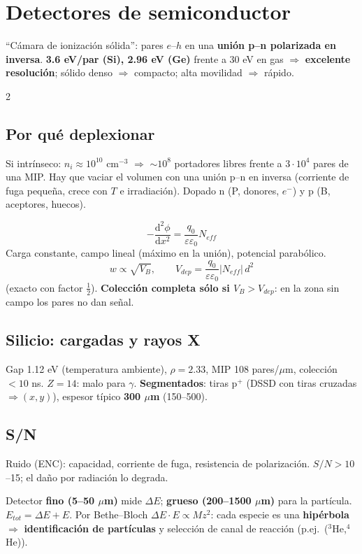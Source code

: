 \documentclass[10pt,a4paper]{article}
\newcommand{\imp}[1]{\textbf{\color{BrickRed}#1}}
\begin{document}
\section{Detectores de semiconductor}
\begin{clave}
``Cámara de ionización sólida'': pares $e$--$h$ en una \textbf{unión p--n polarizada en inversa}. \textbf{3.6 eV/par (Si), 2.96 eV (Ge)} frente a 30 eV en gas
$\Rightarrow$ \imp{excelente resolución}; sólido denso $\Rightarrow$ compacto; alta movilidad $\Rightarrow$ rápido.
\end{clave}
\begin{multicols}{2}
\subsection{Por qué deplexionar}
Si intrínseco: $n_i\approx10^{10}$ cm$^{-3}$ $\Rightarrow$ $\sim10^8$ portadores libres frente a $3\cdot10^4$ pares de una MIP. Hay que vaciar el volumen con una unión p--n en inversa (corriente de fuga pequeña, crece con $T$ e irradiación).
Dopado n (P, donores, $e^-$) y p (B, aceptores, huecos).
\begin{clave}
\[ -\frac{\mathrm{d}^2\phi}{\mathrm{d}x^2}=\frac{q_0}{\varepsilon\varepsilon_0}N_{eff} \]
Carga constante, campo lineal (máximo en la unión), potencial parabólico.
\[ w\propto\sqrt{V_B},\qquad V_{dep}=\frac{q_0}{\varepsilon\varepsilon_0}|N_{eff}|\,d^2 \]
(exacto con factor $\tfrac12$). \imp{Colección completa sólo si $V_B>V_{dep}$}: en la zona sin campo los pares no dan señal.
\end{clave}
\subsection{Silicio: cargadas y rayos X}
Gap 1.12 eV (temperatura ambiente), $\rho=2.33$, MIP 108 pares/$\mu$m, colección $<10$ ns. $Z=14$: malo para $\gamma$.
\textbf{Segmentados}: tiras p$^+$ (DSSD con tiras cruzadas $\Rightarrow(x,y)$), espesor típico \textbf{300 $\mu$m} (150--500).
\subsection{S/N}
Ruido (ENC): capacidad, corriente de fuga, resistencia de polarización. $S/N>10$--15; el daño por radiación lo degrada.
\columnbreak
\begin{clave}
Detector \textbf{fino (5--50 $\mu$m)} mide $\Delta E$; \textbf{grueso (200--1500 $\mu$m)} para la partícula. \textbf{$E_{tot}=\Delta E+E$}.
Por Bethe--Bloch $\Delta E\cdot E\propto Mz^2$: cada especie es una \textbf{hipérbola} $\Rightarrow$ \imp{identificación de partículas} y selección de canal de reacción (p.ej.\ ($^3$He,$^4$He)).
\end{clave}

\end{multicols}
\end{document}
